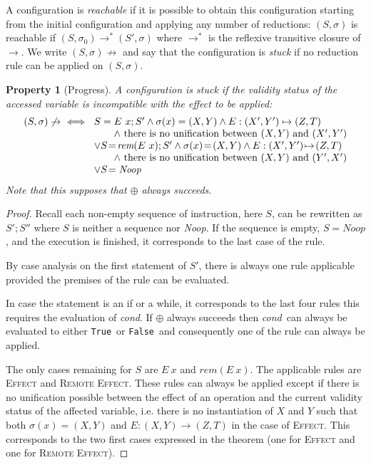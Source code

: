 \documentclass[preprint,12pt]{elsarticle}
\newcommand{\symb}[1]{\textit{#1}}
\newcommand{\noop}{\symb{Noop}}
\newcommand{\cond}{\symb{cond}}
\newcommand{\rem}[1]{\symb{rem}(#1)}
\newcommand{\True}{{\tt True}}
\newcommand{\False}{{\tt False}}
\newtheorem{Property}{Property}
\begin{document}
A configuration is \emph{reachable} if it is possible to obtain this configuration 
starting from the initial configuration and applying any number of reductions: 
$(S,\sigma)$ is reachable if $(S,\sigma_0)\to^*(S',\sigma)$ where $\to^*$ is the 
reflexive 
transitive closure of $\to$. We write $(S,\sigma)\not\to $ and say that the configuration 
is \emph{stuck} if no reduction rule can be 
applied on $(S,\sigma)$.
\begin{Property}[Progress]\label{prop:stuck}
 A configuration is stuck if the validity status of the accessed variable is 
incompatible with the effect to be applied:\\[-1ex]
\[\begin{array}{@{}l@{}}
(S,\sigma)\not\to\ \iff~
 \begin{array}[t]{@{}l@{}}
S=E~x;S' \land \sigma(x)=(X,Y) 
							\land E:  (X',Y')\mapsto (Z,T)\ 
						\\\qquad 	\land~\text{there is no unification  between } 
							(X,Y)   
							\text{ and } (X',Y')\\
\lor S\!=\!\rem{E~x};S' \land \sigma(x)\!=\!(X,Y) 
							\land E:  (X',Y')\!\mapsto\! (Z,T)\ 
							\\\qquad \land~\text{there is no unification  between } 
							(X,Y)   
							\text{ and } (Y',X')	\\
\lor S\!= \noop	
\end{array}
\end{array}\]
Note that this supposes that $\oplus$ always succeeds.
\end{Property}
\begin{proof}
Recall each non-empty sequence of instruction, here $S$,  can be rewritten as $S';S''$ where $S$ 
is neither a sequence nor \noop.
If the sequence is empty, $S=\noop$, and the execution is finished, it corresponds to the last case of the rule.

By case analysis on the first statement of $S'$, there is always 
one rule applicable provided the premises of the rule can be evaluated.

In  case the statement is an if or a while, it corresponds to the last four rules this requires the evaluation of \cond. If $\oplus$ 
always succeeds then \cond\ can always be 
evaluated to either \True\ or \False\ and consequently one of the rule can always be applied.


 The only cases remaining for $S$ are $E~x$ and $\rem {E~x}$. The applicable rules are \textsc{Effect} and \textsc{Remote Effect}. These rules can always be applied except if there is no unification possible between the 
effect of an operation and the current validity status of the affected variable, i.e. there is no instantiation of $X$ and $Y$ such that both $\sigma(x)=(X,Y)$ and $E: (X,Y)\to(Z,T)$ in the case of \textsc{Effect}. This  corresponds to the two first
cases expressed in the theorem (one for \textsc{Effect} and one for \textsc{Remote Effect}).
\end{proof}
\end{document}
